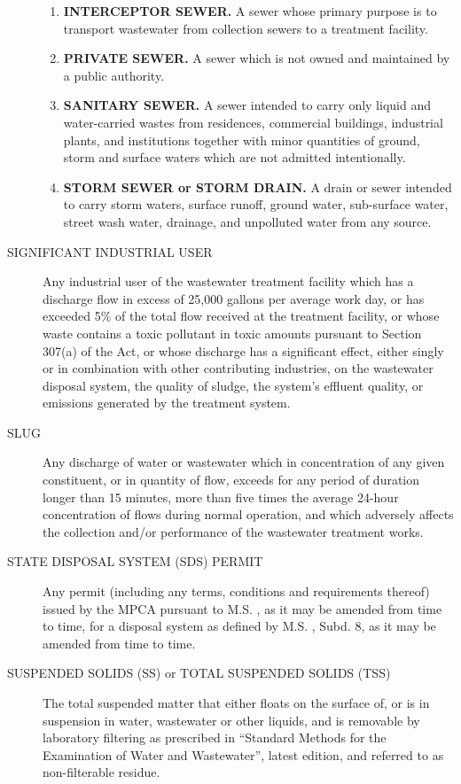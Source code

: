 \documentclass[code.tex]{subfiles}
\begin{document}
\begin{description}
\begin{enumerate}
\item \textbf{INTERCEPTOR SEWER.} A sewer whose primary purpose is to transport wastewater from collection sewers to a treatment facility.
\item \textbf{PRIVATE SEWER.} A sewer which is not owned and maintained by a public authority.
\item \textbf{SANITARY SEWER.} A sewer intended to carry only liquid and water-carried wastes from residences, commercial buildings, industrial plants, and institutions together with minor quantities of ground, storm and surface waters which are not admitted intentionally.
\item \textbf{STORM SEWER or STORM DRAIN.} A drain or sewer intended to carry storm waters, surface runoff, ground water, sub-surface water, street wash water, drainage, and unpolluted water from any source.
\end{enumerate}
\item[SIGNIFICANT INDUSTRIAL USER] Any industrial user of the wastewater treatment facility which has a discharge flow in excess of 25,000 gallons per average work day, or has exceeded 5\% of the total flow received at the treatment facility, or whose waste contains a toxic pollutant in toxic amounts pursuant to Section 307(a) of the Act, or whose discharge has a significant effect, either singly or in combination with other contributing industries, on the wastewater disposal system, the quality of sludge, the system’s effluent quality, or emissions generated by the treatment system.
\item[SLUG] Any discharge of water or wastewater which in concentration of any given constituent, or in quantity of flow, exceeds for any period of duration longer than 15 minutes, more than five times the average 24-hour concentration of flows during normal operation, and which adversely affects the collection and/or performance of the wastewater treatment works.
\item[STATE DISPOSAL SYSTEM (SDS) PERMIT] Any permit (including any terms, conditions and requirements thereof) issued by the MPCA pursuant to M.S. , as it may be amended from time to time, for a disposal system as defined by M.S. , Subd. 8, as it may be amended from time to time.
\item[SUSPENDED SOLIDS (SS) or TOTAL SUSPENDED SOLIDS (TSS)] The total suspended matter that either floats on the surface of, or is in suspension in water, wastewater or other liquids, and is removable by laboratory filtering as prescribed in “Standard Methods for the Examination of Water and Wastewater”, latest edition, and referred to as non-filterable residue.

\end{description}
\end{document}
